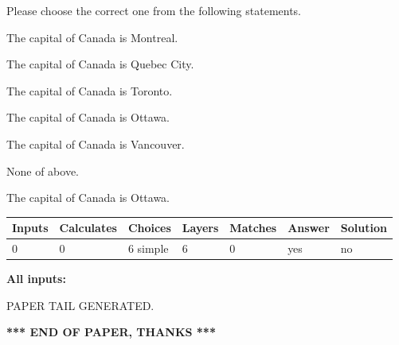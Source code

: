 \documentclass[12pt]{article}
\begin{document}
  
Please choose the correct one from the following statements.
 
 
The capital of Canada is Montreal.
 
 
The capital of Canada is Quebec City.
 
 
The capital of Canada is Toronto.
 
 
The capital of Canada is Ottawa.
 
 
The capital of Canada is Vancouver.
 
 
 None of above.
 
 
\noindent{}
 
 
The capital of Canada is Ottawa.
 
 
\noindent{}
 
 
   
   
   
   
\noindent\begin{tabular}{|l|l|l|l|l|l|l|}
 \hline
Inputs & Calculates & Choices & Layers & Matches & Answer & Solution \\ \hline
 0  & 
 0  & 
 6
  simple  
  & 
 6  & 
 0  & 
  yes & 
  no 
  \\ \hline
 \end{tabular}
   
   
   
   
\noindent{}
   
   
   
   
\noindent\vspace{0.1in}\hspace{-0.08in} {\textbf{\Large{All inputs: }}}
   
   
   
   
   
   
 \vspace{0.2in}
 
   
   
\vspace{2.0in} PAPER TAIL GENERATED.
   
   
   
   
\vspace{1.0in} 
{\textbf{\large{ *** END OF PAPER, THANKS *** }}} 
   
\end{document}
